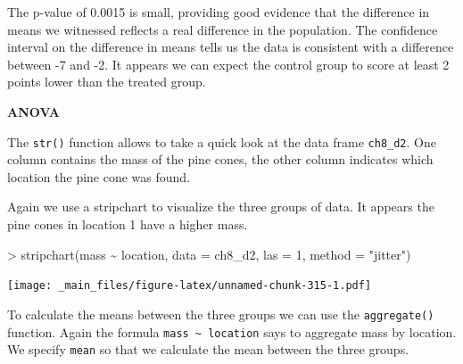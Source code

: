 \documentclass[
]{book}
\newenvironment{Shaded}{\begin{snugshade}}{\end{snugshade}}
\newcommand{\AttributeTok}[1]{\textcolor[rgb]{0.77,0.63,0.00}{#1}}
\newcommand{\DecValTok}[1]{\textcolor[rgb]{0.00,0.00,0.81}{#1}}
\newcommand{\ErrorTok}[1]{\textcolor[rgb]{0.64,0.00,0.00}{\textbf{#1}}}
\newcommand{\FloatTok}[1]{\textcolor[rgb]{0.00,0.00,0.81}{#1}}
\newcommand{\FunctionTok}[1]{\textcolor[rgb]{0.00,0.00,0.00}{#1}}
\newcommand{\NormalTok}[1]{#1}
\newcommand{\SpecialCharTok}[1]{\textcolor[rgb]{0.00,0.00,0.00}{#1}}
\newcommand{\StringTok}[1]{\textcolor[rgb]{0.31,0.60,0.02}{#1}}
\begin{document}
The p-value of 0.0015 is small, providing good evidence that the difference in means we witnessed reflects a real difference in the population. The confidence interval on the difference in means tells us the data is consistent with a difference between -7 and -2. It appears we can expect the control group to score at least 2 points lower than the treated group.

\textbf{ANOVA}

The \texttt{str()} function allows to take a quick look at the data frame \texttt{ch8\_d2}. One column contains the mass of the pine cones, the other column indicates which location the pine cone was found.

\begin{Shaded}
\end{Shaded}

Again we use a stripchart to visualize the three groups of data. It appears the pine cones in location 1 have a higher mass.

\begin{Shaded}
\begin{Highlighting}[]
\SpecialCharTok{\textgreater{}} \FunctionTok{stripchart}\NormalTok{(mass }\SpecialCharTok{\textasciitilde{}}\NormalTok{ location, }\AttributeTok{data =}\NormalTok{ ch8\_d2, }\AttributeTok{las =} \DecValTok{1}\NormalTok{, }\AttributeTok{method =} \StringTok{"jitter"}\NormalTok{)}
\end{Highlighting}
\end{Shaded}

\texttt{[image: \_main\_files/figure-latex/unnamed-chunk-315-1.pdf]}

To calculate the means between the three groups we can use the \texttt{aggregate()} function. Again the formula \texttt{mass\ \textasciitilde{}\ location} says to aggregate mass by location. We specify \texttt{mean} so that we calculate the mean between the three groups.
\end{document}

